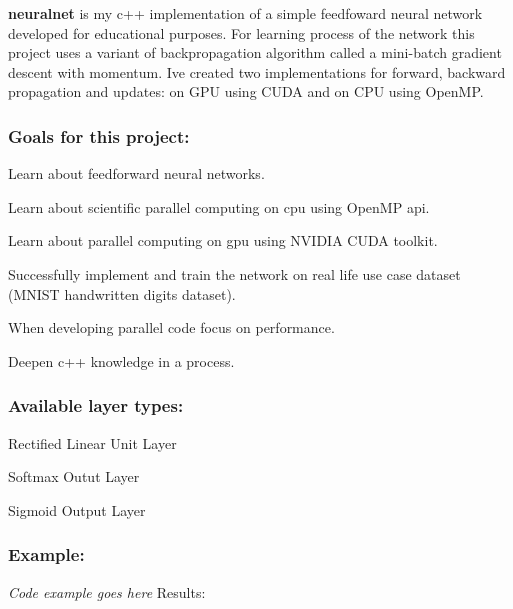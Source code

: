 {\bfseries neuralnet} is my c++ implementation of a simple feedfoward neural network developed for educational purposes. For learning process of the network this project uses a variant of backpropagation algorithm called a mini-\/batch gradient descent with momentum. I\textquotesingle{}ve created two implementations for forward, backward propagation and updates\+: on G\+PU using C\+U\+DA and on C\+PU using Open\+MP.

\subsubsection*{Goals for this project\+:}


\begin{DoxyItemize}
\item Learn about feedforward neural networks.
\item Learn about scientific parallel computing on cpu using Open\+MP api.
\item Learn about parallel computing on gpu using N\+V\+I\+D\+IA C\+U\+DA toolkit.
\item Successfully implement and train the network on real life use case dataset (M\+N\+I\+ST handwritten digits dataset).
\item When developing parallel code focus on performance.
\item Deepen c++ knowledge in a process. \subsubsection*{Available layer types\+:}
\end{DoxyItemize}


\begin{DoxyItemize}
\item Rectified Linear Unit Layer
\item Softmax Outut Layer
\item Sigmoid Output Layer \subsubsection*{Example\+:}
\end{DoxyItemize}

{\itshape Code example goes here} Results\+: 